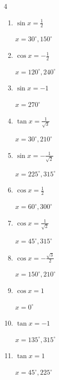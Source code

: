 \begin{multicols}{4}
\begin{enumerate}
        $\displaystyle x = 60^{\circ} , 120^{\circ}$

  \item $\displaystyle \sin{x}  = \frac{1}{2}$

        $\displaystyle x = 30^{\circ} , 150^{\circ}$

  \item $\displaystyle \cos{x}  = -\frac{1}{2}$

        $\displaystyle x = 120^{\circ} , 240^{\circ}$

  \item $\displaystyle \sin{x}  = -1$

        $\displaystyle x = 270^{\circ}$

  \item $\displaystyle \tan{x}  = \frac{1}{\sqrt{3}}$

        $\displaystyle x = 30^{\circ} , 210^{\circ}$

  \item $\displaystyle \sin{x}  = -\frac{1}{\sqrt{2}}$

        $\displaystyle x = 225^{\circ} , 315^{\circ}$

  \item $\displaystyle \cos{x}  = \frac{1}{2}$

        $\displaystyle x = 60^{\circ} , 300^{\circ}$

  \item $\displaystyle \cos{x}  = \frac{1}{\sqrt{2}}$

        $\displaystyle x = 45^{\circ} , 315^{\circ}$

  \item $\displaystyle \cos{x}  = -\frac{\sqrt{3}}{2}$

        $\displaystyle x = 150^{\circ} , 210^{\circ}$

  \item $\displaystyle \cos{x}  = 1$

        $\displaystyle x = 0^{\circ}$

  \item $\displaystyle \tan{x}  = -1$

        $\displaystyle x = 135^{\circ} , 315^{\circ}$

  \item $\displaystyle \tan{x}  = 1$

        $\displaystyle x = 45^{\circ} , 225^{\circ}$

\columnbreak %

\resetques


\end{enumerate}
\end{multicols}
